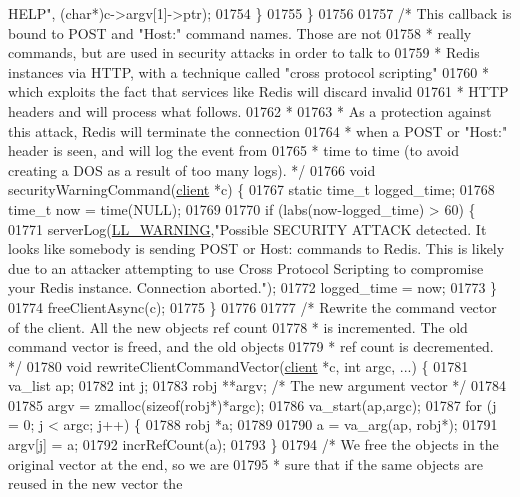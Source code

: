 \begin{DoxyCode}
{{{{{{{{{{{{{{{{{{{{{       HELP"}, (\textcolor{keywordtype}{char}*)c->argv[1]->ptr);
01754     \}
01755 \}
01756 
01757 \textcolor{comment}{/* This callback is bound to POST and "Host:" command names. Those are not}
01758 \textcolor{comment}{ * really commands, but are used in security attacks in order to talk to}
01759 \textcolor{comment}{ * Redis instances via HTTP, with a technique called "cross protocol scripting"}
01760 \textcolor{comment}{ * which exploits the fact that services like Redis will discard invalid}
01761 \textcolor{comment}{ * HTTP headers and will process what follows.}
01762 \textcolor{comment}{ *}
01763 \textcolor{comment}{ * As a protection against this attack, Redis will terminate the connection}
01764 \textcolor{comment}{ * when a POST or "Host:" header is seen, and will log the event from}
01765 \textcolor{comment}{ * time to time (to avoid creating a DOS as a result of too many logs). */}
01766 \textcolor{keywordtype}{void} securityWarningCommand(\hyperlink{structclient}{client} *c) \{
01767     \textcolor{keyword}{static} time\_t logged\_time;
01768     time\_t now = time(NULL);
01769 
01770     \textcolor{keywordflow}{if} (labs(now-logged\_time) > 60) \{
01771         serverLog(\hyperlink{server_8h_a31229b9334bba7d6be2a72970967a14b}{LL\_WARNING},\textcolor{stringliteral}{"Possible SECURITY ATTACK detected. It looks like somebody is
       sending POST or Host: commands to Redis. This is likely due to an attacker attempting to use Cross Protocol
       Scripting to compromise your Redis instance. Connection aborted."});
01772         logged\_time = now;
01773     \}
01774     freeClientAsync(c);
01775 \}
01776 
01777 \textcolor{comment}{/* Rewrite the command vector of the client. All the new objects ref count}
01778 \textcolor{comment}{ * is incremented. The old command vector is freed, and the old objects}
01779 \textcolor{comment}{ * ref count is decremented. */}
01780 \textcolor{keywordtype}{void} rewriteClientCommandVector(\hyperlink{structclient}{client} *c, \textcolor{keywordtype}{int} argc, ...) \{
01781     va\_list ap;
01782     \textcolor{keywordtype}{int} j;
01783     robj **argv; \textcolor{comment}{/* The new argument vector */}
01784 
01785     argv = zmalloc(\textcolor{keyword}{sizeof}(robj*)*argc);
01786     va\_start(ap,argc);
01787     \textcolor{keywordflow}{for} (j = 0; j < argc; j++) \{
01788         robj *a;
01789 
01790         a = va\_arg(ap, robj*);
01791         argv[j] = a;
01792         incrRefCount(a);
01793     \}
01794     \textcolor{comment}{/* We free the objects in the original vector at the end, so we are}
01795 \textcolor{comment}{     * sure that if the same objects are reused in the new vector the}
}}}}}}}}}}}}}}}}}}}}
\end{DoxyCode}
